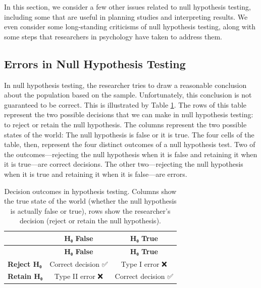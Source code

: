 \documentclass[
]{krantz}
\begin{document}
In this section, we consider a few other issues related to null hypothesis testing, including some that are useful in planning studies and interpreting results. We even consider some long-standing criticisms of null hypothesis testing, along with some steps that researchers in psychology have taken to address them.

\subsection*{Errors in Null Hypothesis Testing}\label{errors-in-null-hypothesis-testing}


In null hypothesis testing, the researcher tries to draw a reasonable conclusion about the population based on the sample. Unfortunately, this conclusion is not guaranteed to be correct. This is illustrated by Table \ref{tab:error}. The rows of this table represent the two possible decisions that we can make in null hypothesis testing: to reject or retain the null hypothesis. The columns represent the two possible states of the world: The null hypothesis is false or it is true. The four cells of the table, then, represent the four distinct outcomes of a null hypothesis test. Two of the outcomes---rejecting the null hypothesis when it is false and retaining it when it is true---are correct decisions. The other two---rejecting the null hypothesis when it is true and retaining it when it is false---are errors.

\begin{longtable}[]{@{}lcc@{}}
\caption{\label{tab:error} Decision outcomes in hypothesis testing. Columns show the true state of the world (whether the null hypothesis is actually false or true), rows show the researcher's decision (reject or retain the null hypothesis).}\tabularnewline
\toprule\noalign{}
& \textbf{H₀ False} & \textbf{H₀ True} \\
\midrule\noalign{}
\endfirsthead
\toprule\noalign{}
& \textbf{H₀ False} & \textbf{H₀ True} \\
\midrule\noalign{}
\endhead
\bottomrule\noalign{}
\endlastfoot
\textbf{Reject H₀} & Correct decision ✅ & Type I error ❌ \\
\textbf{Retain H₀} & Type II error ❌ & Correct decision ✅ \\
\end{longtable}
\end{document}

